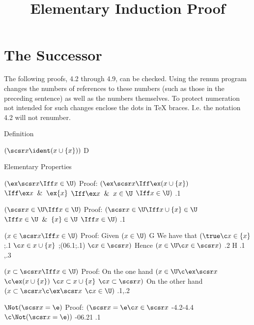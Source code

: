 \documentclass{article}
\begin{document}
\title{Elementary Induction Proof}




\section{The Successor}
\label{successor}


The following proofs, 4.2 through 4.9, can be checked.
Using the renum program changes the numbers of references to these
numbers (such as those in the preceding sentence) as well as the numbers
themselves.  To protect numeration not intended for such changes 
enclose the dots in TeX braces.  I.e. the notation 4{.}2 will not renumber.

\lineb

\noindent{}
Definition

 $( \scsr x  \ident  (x \cup \{x\})) $ \By D

\lineb

\noindent{}
Elementary Properties

 $(\ex \scsr x \Iff x \in \U)$
  \lineb Proof:
	 $(\ex \scsr x  \Iff \ex (x \cup \{x\}) $ 
	\lined $ \Iff \ex x \And \ex \{x\} $ 
	\lined $ \Iff \ex x \And  x \in \U $ 
	\lined $ \Iff x \in \U) $ 
	\lineb \Bye .1

 $(\scsr x \in \U \Iff x \in \U)$
	\lineb Proof:
	 $(\scsr x \in \U  \Iff x \cup \{x\} \in \U $ 
	\lined $ \Iff x \in \U \And \{x\} \in \U $ 
	\lined $ \Iff x \in \U)$ 
	\lineb \Bye .1

 $(x \in \scsr x \Iff x \in \U)$
	\lineb Proof: Given
	 $(x \in \U) $ \By G
\linea We have that
	 $ (\true \c x \in \{x\} $ ;.1
	\lineb $ \c x \in x \cup \{x\} $ ;(06.1;.1)
	\lineb $ \c x \in \scsr x)$ 
	\linea Hence
	 $(x \in \U \c x \in \scsr x)$ \By .2 H .1
	\lineb {},.3

 $(x \subset \scsr x \Iff x \in \U)$
\lineb Proof: On the one hand
 $(x \in \U\c \ex \scsr x$ 
\linec $\c \ex (x \cup \{x\})$ 
\linec $\c x \subset x \cup \{x\}$ 
\linec $\c x \subset \scsr x)$ 
\linea On the other hand
 $(x \subset \scsr x\c \ex \scsr x$ 
\lined $\c x \in \U)$ 
\lineb \Bye .1,.2

 $\Not (\scsr x = \e)$
\lineb Proof:
	 $(\scsr x = \e\c x \in \scsr x$ -4.2-4.4
\lined $\c \Not(\scsr x = \e))$ -06.21
	\lineb \Bye .1 
\end{document}
